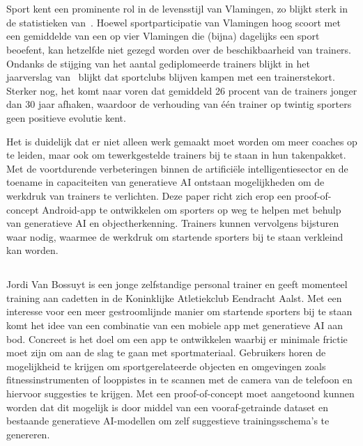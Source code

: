 

\chapter{}
\label{ch:inleiding}
Sport kent een prominente rol in de levensstijl van Vlamingen, zo blijkt sterk in de statistieken van~\textcite{StatistiekVlaanderen2023}.
Hoewel sportparticipatie van Vlamingen hoog scoort met een gemiddelde van een op vier Vlamingen die (bijna) dagelijks een sport beoefent, kan hetzelfde niet gezegd worden over de beschikbaarheid van trainers.
Ondanks de stijging van het aantal gediplomeerde trainers blijkt in het jaarverslag van~\textcite{SportVlaanderen2023} blijkt dat sportclubs blijven kampen met een trainerstekort.
Sterker nog, het komt naar voren dat gemiddeld 26 procent van de trainers jonger dan 30 jaar afhaken, waardoor de verhouding van \'e\'en trainer op twintig sporters geen positieve evolutie kent.

Het is duidelijk dat er niet alleen werk gemaakt moet worden om meer coaches op te leiden, maar ook om tewerkgestelde trainers bij te staan in hun takenpakket.
Met de voortdurende verbeteringen binnen de artifici\"ele intelligentiesector en de toename in capaciteiten van generatieve AI ontstaan mogelijkheden om de werkdruk van trainers te verlichten.
Deze paper richt zich erop een proof-of-concept Android-app te ontwikkelen om sporters op weg te helpen met behulp van generatieve AI en objectherkenning.
Trainers kunnen vervolgens bijsturen waar nodig, waarmee de werkdruk om startende sporters bij te staan verkleind kan worden.

\section{}
\label{sec:probleemstelling}
Jordi Van Bossuyt is een jonge zelfstandige personal trainer en geeft momenteel training aan cadetten in de Koninklijke Atletiekclub Eendracht Aalst.
Met een interesse voor een meer gestroomlijnde manier om startende sporters bij te staan komt het idee van een combinatie van een mobiele app met generatieve AI aan bod.
Concreet is het doel om een app te ontwikkelen waarbij er minimale frictie moet zijn om aan de slag te gaan met sportmateriaal.
Gebruikers horen de mogelijkheid te krijgen om sportgerelateerde objecten en omgevingen zoals fitnessinstrumenten of looppistes in te scannen met de camera van de telefoon en hiervoor suggesties te krijgen.
Met een proof-of-concept moet aangetoond kunnen worden dat dit mogelijk is door middel van een vooraf-getrainde dataset en bestaande generatieve AI-modellen om zelf suggestieve trainingsschema's te genereren.

